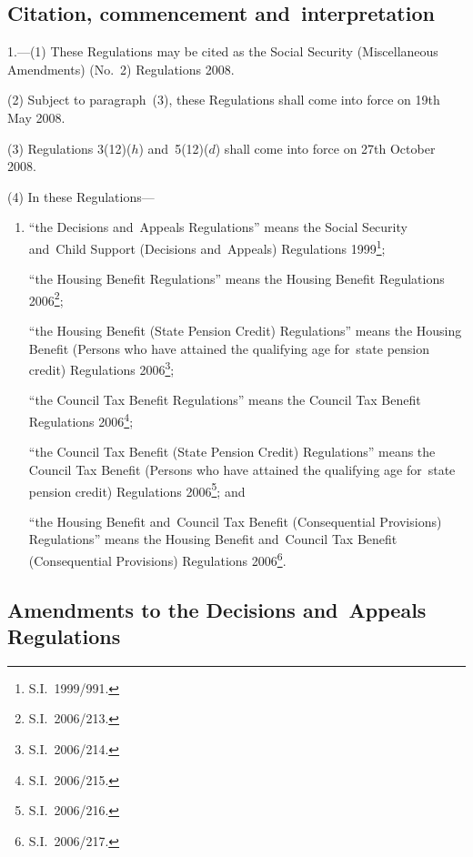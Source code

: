 \documentclass[12pt,a4paper]{article}
\begin{document}
{\sloppy

\tableofcontents

}

\bigskip

\setcounter{secnumdepth}{-2}

\subsection[1. Citation, commencement and~interpretation]{Citation, commencement and~interpretation}

1.---(1)  These Regulations may be cited as the Social Security (Miscellaneous Amendments) (No.~2) Regulations 2008.

(2) Subject to paragraph~(3), these Regulations shall come into force on 19th May 2008.

(3) Regulations 3(12)($h$)  and~5(12)($d$)  shall come into force on 27th October 2008.

(4) In these Regulations—
\begin{enumerate}\item[]
“the Decisions and~Appeals Regulations” means the Social Security and~Child Support (Decisions and~Appeals) Regulations 1999\footnote{S.I.~1999/991.};

“the Housing Benefit Regulations” means the Housing Benefit Regulations 2006\footnote{S.I.~2006/213.};

“the Housing Benefit (State Pension Credit) Regulations” means the Housing Benefit (Persons who have attained the qualifying age for~state pension credit) Regulations 2006\footnote{S.I.~2006/214.};

“the Council Tax Benefit Regulations” means the Council Tax Benefit Regulations 2006\footnote{S.I.~2006/215.};

“the Council Tax Benefit (State Pension Credit) Regulations” means the Council Tax Benefit (Persons who have attained the qualifying age for~state pension credit) Regulations 2006\footnote{S.I.~2006/216.}; and

“the Housing Benefit and~Council Tax Benefit (Consequential Provisions) Regulations” means the Housing Benefit and~Council Tax Benefit (Consequential Provisions) Regulations 2006\footnote{S.I.~2006/217.}.
\end{enumerate}

\subsection[2. Amendments to the Decisions and~Appeals Regulations]{Amendments to the Decisions and~Appeals Regulations}
\end{document}

